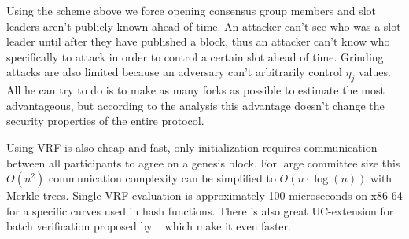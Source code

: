 Using the scheme above we force opening consensus group members and slot leaders aren't publicly known ahead of time.
An attacker can't see who was a slot leader until after they have published a block, thus an attacker can't know
who specifically to attack in order to control a certain slot ahead of time.
Grinding attacks are also limited because an adversary can't arbitrarily control $\eta_j$ values.
All he can try to do is to make as many forks as possible to estimate the most advantageous, but according to the analysis this advantage doesn't change the security properties of the entire protocol.

Using VRF is also cheap and fast, only initialization requires communication between all participants to agree on a genesis block.
For large committee size this $O(n^2)$ communication complexity can be simplified to $O(n \cdot \log(n))$ with Merkle trees.
Single VRF evaluation is approximately 100 microseconds on x86-64 for a specific curves used in hash functions.
There is also great UC-extension for batch verification proposed by ~\cite{cryptoeprint:2022/1045} which make it even faster.

